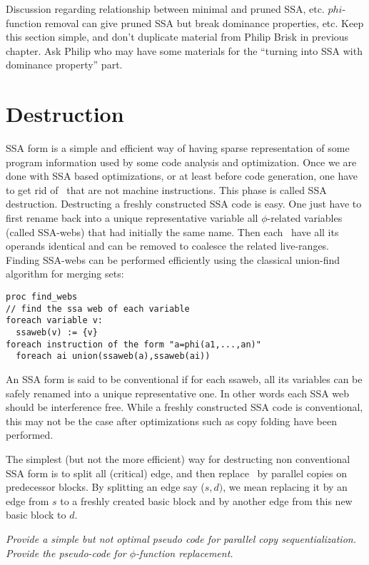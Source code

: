 {Discussion regarding relationship between minimal and pruned SSA, etc.
$phi$-function removal can give pruned SSA but break
dominance properties, etc. Keep this section simple, and don't duplicate
material from Philip Brisk in previous chapter.
Ask Philip who may have some materials for the ``turning into SSA with dominance property'' part.


\section{Destruction }
\label{sec:classical_destruction}

SSA form is a simple and efficient way of having sparse representation of some program information used by some code analysis and optimization. Once we are done with SSA based optimizations, or at least before code generation, one have to get rid of \phiops\ that are not machine instructions. This phase is called SSA destruction. 
Destructing a freshly constructed SSA code is easy. One just have to first rename back into a unique representative variable all $\phi$-related variables (called SSA-webs) that had initially the same name. Then each \phiop\ have all its operands identical and can be removed to coalesce the related live-ranges.
Finding SSA-webs can be performed efficiently using the classical union-find algorithm for merging sets:
\begin{verbatim}
proc find_webs
// find the ssa web of each variable
foreach variable v:
  ssaweb(v) := {v}
foreach instruction of the form "a=phi(a1,...,an)"
  foreach ai union(ssaweb(a),ssaweb(ai))
\end{verbatim}

An SSA form is said to be conventional if for each ssaweb, all its variables can be safely renamed into a unique representative one. In other words each SSA web should be interference free. While a freshly constructed SSA code is conventional, this may not be the case after optimizations such as copy folding have been performed.

The simplest (but not the more efficient) way for destructing non conventional SSA form is to split all (critical) edge, and then replace \phiops\ by parallel copies on predecessor blocks. By splitting an edge say ($s,d)$, we mean replacing it by an edge from $s$ to a freshly created basic block and by another edge from this new basic block to $d$.

{\em Provide a simple but not optimal pseudo code for parallel copy sequentialization. Provide the pseudo-code for $\phi$-function replacement.}

}
